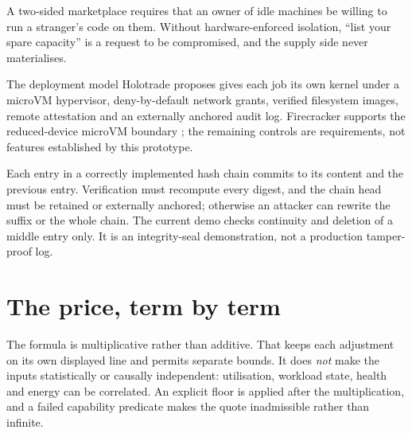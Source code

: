 \documentclass[11pt,letterpaper]{article}
\begin{document}
A two-sided marketplace requires that an owner of idle machines be willing to
run a stranger's code on them. Without hardware-enforced isolation, ``list your
spare capacity'' is a request to be compromised, and the supply side never
materialises.

The deployment model Holotrade proposes gives each job its own kernel under a
microVM hypervisor, deny-by-default network grants, verified filesystem images,
remote attestation and an externally anchored audit log. Firecracker supports
the reduced-device microVM boundary \cite{agache2020firecracker}; the remaining
controls are requirements, not features established by this prototype.

\begin{plainbox}
Each entry in a correctly implemented hash chain commits to its content and the
previous entry. Verification must recompute every digest, and the chain head
must be retained or externally anchored; otherwise an attacker can rewrite the
suffix or the whole chain. The current demo checks continuity and deletion of a
middle entry only. It is an integrity-seal demonstration, not a production
tamper-proof log.
\end{plainbox}

\newpage

\section{The price, term by term}

The formula is multiplicative rather than additive. That keeps each adjustment
on its own displayed line and permits separate bounds. It does \emph{not} make
the inputs statistically or causally independent: utilisation, workload state,
health and energy can be correlated. An explicit floor is applied after the
multiplication, and a failed capability predicate makes the quote inadmissible
rather than infinite.
\end{document}
